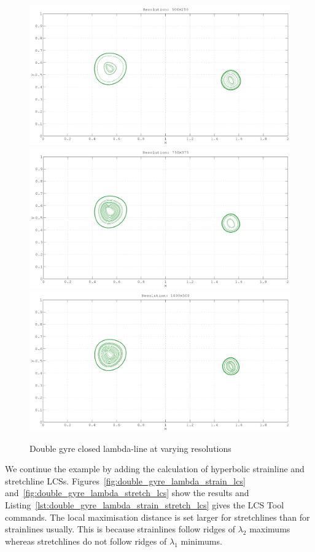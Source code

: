 \documentclass{article}
\begin{document}
\begin{figure}[hbt]
  \centering
  \includegraphics[width=.8\textwidth]{graphics/double_gyre/lambda_lcs_convergence_500}
\includegraphics[width=.8\textwidth]{graphics/double_gyre/lambda_lcs_convergence_750}
\includegraphics[width=.8\textwidth]{graphics/double_gyre/lambda_lcs_convergence_1000}
  \caption{Double gyre closed lambda-line at varying resolutions}
  \label{fig:double_gyre_lambda_lcs_convergence}
\end{figure}

We continue the example by adding the calculation of hyperbolic strainline and stretchline LCSs. Figures~\ref{fig:double_gyre_lambda_strain_lcs} and~\ref{fig:double_gyre_lambda_stretch_lcs} show the results and Listing~\ref{lst:double_gyre_lambda_strain_stretch_lcs} gives the LCS Tool commands. The local maximisation distance is set larger for stretchlines than for strainlines usually. This is because strainlines follow ridges of $\lambda_2$ maximums whereas stretchlines do not follow ridges of $\lambda_1$ minimums.
\end{document}
